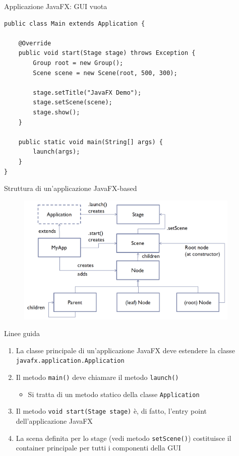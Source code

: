 \documentclass[presentation]{beamer}
\begin{document}
\begin{frame}[fragile]{Applicazione JavaFX: GUI vuota}
\begin{lstlisting}
public class Main extends Application {

	@Override
	public void start(Stage stage) throws Exception {
		Group root = new Group();
		Scene scene = new Scene(root, 500, 300);
		
		stage.setTitle("JavaFX Demo");
		stage.setScene(scene);
		stage.show();
	}
	
	public static void main(String[] args) {
		launch(args);
	}
}
\end{lstlisting}
\end{frame}

%

\begin{frame}{Struttura di un'applicazione JavaFX-based}
\begin{figure}
\includegraphics[width=0.95\textwidth]{img/javafx-app-arch.png}
\end{figure}
\end{frame}

\begin{frame}{Linee guida}
\begin{enumerate}\itemsep20pt
\item La classe principale di un'applicazione JavaFX deve estendere la classe \texttt{javafx.application.Application}
\item Il metodo \texttt{main()} deve chiamare il metodo \texttt{launch()}
\begin{itemize}
\item Si tratta di un metodo statico della classe \texttt{Application}
\end{itemize}
\item Il metodo \texttt{void start(Stage stage)} è, di fatto, l'entry point dell'applicazione JavaFX
\item La scena definita per lo stage (vedi metodo \texttt{setScene()}) costituisce il container principale per tutti i componenti della GUI
\end{enumerate}
\end{frame}
\end{document}
